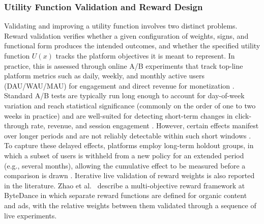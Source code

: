 \documentclass[manuscript,review,screen]{acmart}
\begin{document}
\subsubsection{Utility Function Validation and Reward Design}
Validating and improving a utility function involves two distinct problems. Reward validation verifies whether a given configuration of weights, signs, and functional form produces the intended outcomes, and whether the specified utility function $U(x)$ tracks the platform objectives it is meant to represent. In practice, this is assessed through online A/B experiments that track top-line platform metrics such as daily, weekly, and monthly active users (DAU/WAU/MAU) for engagement and direct revenue for monetization \cite{hohnhold2015focusing, gauci2018horizon}. Standard A/B tests are typically run long enough to account for day-of-week variation and reach statistical significance (commonly on the order of one to two weeks in practice) and are well-suited for detecting short-term changes in click-through rate, revenue, and session engagement \cite{hohnhold2015focusing}. However, certain effects manifest over longer periods and are not reliably detectable within such short windows \cite{hohnhold2015focusing}. To capture these delayed effects, platforms employ long-term holdout groups, in which a subset of users is withheld from a new policy for an extended period (e.g., several months), allowing the cumulative effect to be measured before a comparison is drawn \cite{hohnhold2015focusing, mcdonald2023impatient}. Iterative live validation of reward weights is also reported in the literature. Zhao et al.\ \cite{zhao2020jointly} describe a multi-objective reward framework at ByteDance in which separate reward functions are defined for organic content and ads, with the relative weights between them validated through a sequence of live experiments.
\end{document}
